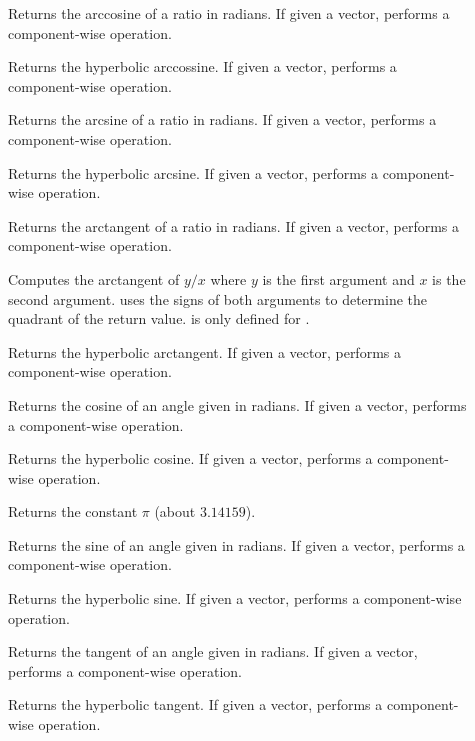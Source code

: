 \begin{description}
\item[]   Returns the
  arccosine of a ratio in radians. If given a vector, performs a
  component-wise operation.
\item[]  
  Returns the hyperbolic arccossine. If given a vector, performs a
  component-wise operation.
\item[]   Returns the
  arcsine of a ratio in radians. If given a vector, performs a
  component-wise operation.
\item[]  
  Returns the hyperbolic arcsine. If given a vector, performs a
  component-wise operation.
\item[]   Returns the
  arctangent of a ratio in radians. If given a vector, performs a
  component-wise operation.
\item[] Computes the arctangent of $y/x$ where $y$ is the
  first argument and $x$ is the second argument. 
  uses the signs of both arguments to determine the quadrant of the return
  value.  is only defined for .
\item[]  
  Returns the hyperbolic arctangent. If given a vector, performs a
  component-wise operation.
\item[]  Returns the cosine of an angle given in
  radians. If given a vector, performs a component-wise operation.
\item[]  Returns the hyperbolic
  cosine. If given a vector, performs a component-wise operation.
\item[] \index{$\pi$} Returns the constant $\pi$ (about
  $3.14159$).
\item[]  Returns the sine of an angle given in
  radians. If given a vector, performs a component-wise operation.
\item[]  Returns the hyperbolic
  sine. If given a vector, performs a component-wise operation.
\item[]  Returns the tangent of an angle given
  in radians. If given a vector, performs a component-wise operation.
\item[]  Returns the hyperbolic
  tangent. If given a vector, performs a component-wise operation.
\end{description}

